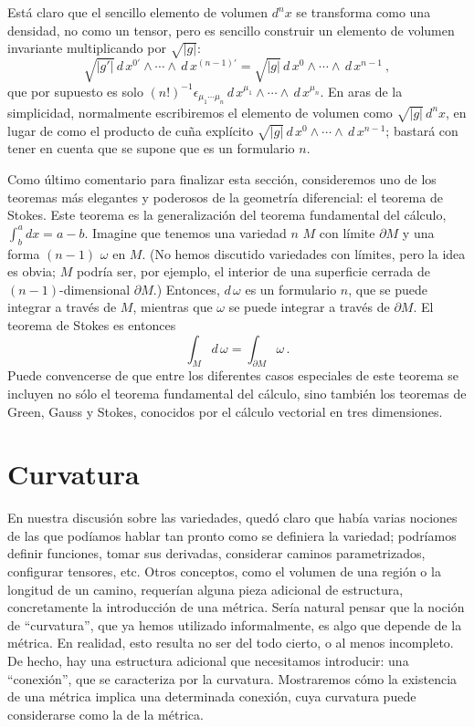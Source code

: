 \documentclass[11pt,b5paper,openany,twoside]{book}
\begin{document}
Está claro que el sencillo elemento de volumen $d^nx$ se transforma como una densidad, no como un tensor, pero es sencillo construir un elemento de volumen invariante multiplicando por $\sqrt{|g|}$:
\begin{equation}
\sqrt{|g'|}\, d\,x^{0'}\wedge \cdots \wedge\, d\,x^{(n-1)'}
= \sqrt{|g|}\, d\,x^0\wedge \cdots \wedge\, d\,x^{n-1}\ ,\label{2.48}
\end{equation}
que por supuesto es solo $(n!)^{-1}\epsilon_{\mu_1\cdots\mu_n} \, d\,x^{\mu_1}\wedge \cdots \wedge \, d\,x^{\mu_n}$.
En aras de la simplicidad, normalmente escribiremos el elemento de volumen como $\sqrt{|g|}\,d^nx$, en lugar de como el producto de cuña explícito $\sqrt{|g|}\, d\,x^0\wedge \cdots \wedge\, d\,x^{n-1}$; bastará con tener en cuenta que se supone que es un formulario $n$.

Como último comentario para finalizar esta sección, consideremos uno de los teoremas más elegantes y poderosos de la geometría diferencial: el teorema de Stokes.
Este teorema es la generalización del teorema fundamental del cálculo, $\int^a_b dx = a-b$.
Imagine que tenemos una variedad $n$ $M$ con límite $\partial M$ y una forma $(n-1)$ $\omega$ en $M$.
(No hemos discutido variedades con límites, pero la idea es obvia; $M$ podría ser, por ejemplo, el interior de una superficie cerrada de $(n-1)$-dimensional $\partial M$.)
Entonces, $ d\,\omega$ es un formulario $n$, que se puede integrar a través de $M$, mientras que $\omega$ se puede integrar a través de $\partial M$.
El teorema de Stokes es entonces
\begin{equation}
\int_M  d\,\omega = \int_{\partial M}\omega\,.\label{2.49}
\end{equation}
Puede convencerse de que entre los diferentes casos especiales de este teorema se incluyen no sólo el teorema fundamental del cálculo, sino también los teoremas de Green, Gauss y Stokes, conocidos por el cálculo vectorial en tres dimensiones.





\chapter{Curvatura}



En nuestra discusión sobre las variedades, quedó claro que había varias nociones de las que podíamos hablar tan pronto como se definiera la variedad; podríamos definir funciones, tomar sus derivadas, considerar caminos parametrizados, configurar tensores, etc.
Otros conceptos, como el volumen de una región o la longitud de un camino, requerían alguna pieza adicional de estructura, concretamente la introducción de una métrica.
Sería natural pensar que la noción de ``curvatura'', que ya hemos utilizado informalmente, es algo que depende de la métrica.
En realidad, esto resulta no ser del todo cierto, o al menos incompleto.
De hecho, hay una estructura adicional que necesitamos introducir: una ``conexión'', que se caracteriza por la curvatura.
Mostraremos cómo la existencia de una métrica implica una determinada conexión, cuya curvatura puede considerarse como la de la métrica.
\end{document}
